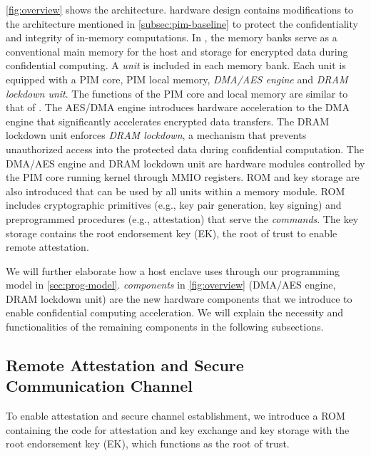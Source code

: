 \autoref{fig:overview} shows the \thename architecture. \thename hardware design contains modifications to the \baseline architecture mentioned in \cref{subsec:pim-baseline} to protect the confidentiality and integrity of in-memory computations.
In \thename, the memory banks serve as a conventional main memory for the host and storage for encrypted data during confidential computing. A \emph{\thename unit} is included in each memory bank. Each \thename unit is equipped with a PIM core, PIM local memory, \emph{DMA/AES engine} and \emph{DRAM lockdown unit}. The functions of the PIM core and local memory are similar to that of \baseline. The AES/DMA engine introduces hardware acceleration to the DMA engine that significantly accelerates encrypted data transfers. The DRAM lockdown unit enforces \emph{DRAM lockdown}, a mechanism that prevents unauthorized access into the protected data during confidential computation. The DMA/AES engine and DRAM lockdown unit are hardware modules controlled by the PIM core running \thename kernel through MMIO registers. ROM and key storage are also introduced that can be used by all \thename units within a memory module. ROM includes cryptographic primitives (e.g., key pair generation, key signing) and preprogrammed procedures (e.g., attestation) that serve the \emph{commands}. The key storage contains the root endorsement key (EK), the root of trust to enable remote attestation. 


We will further elaborate how a host enclave uses \thename through our programming model in \cref{sec:prog-model}. \emph{\thename components} in \autoref{fig:overview} (DMA/AES engine, DRAM lockdown unit) are the new hardware components that we introduce to enable confidential computing acceleration. We will explain the necessity and functionalities of the remaining components in the following subsections. 
 

\subsection{Remote Attestation and Secure Communication Channel} 
\label{subsec:attestation}
\label{subsec:communication}
\label{subsec:secure-channel}


To enable attestation and secure channel establishment, we introduce a ROM containing the code for attestation and key exchange and key storage with the root endorsement key (EK), which functions as the root of trust.

